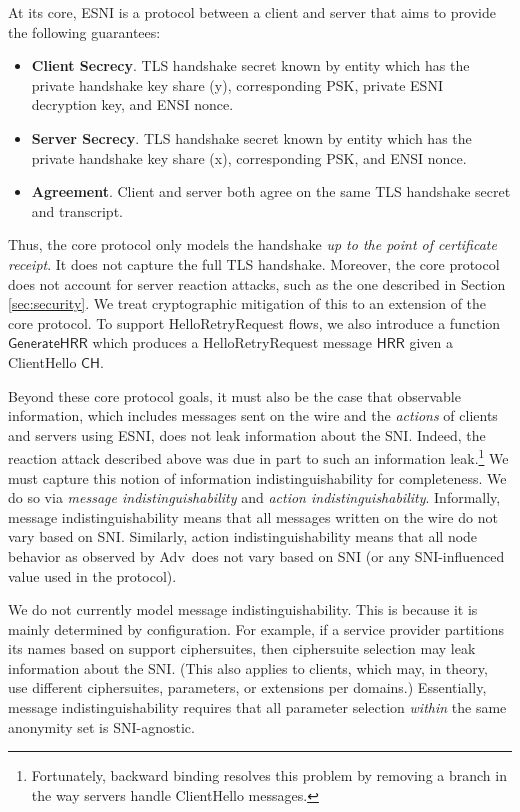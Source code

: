 \documentclass{article}
\theoremstyle{definition}
\newcommand{\adv}{{\sf Adv}}
\theoremstyle{definition}
\begin{document}
At its core, ESNI is a protocol between a client and server that aims to provide the following guarantees:
%
\begin{itemize}
  \item {\bf Client Secrecy}. TLS handshake secret known by entity which has the private handshake key 
  share (y), corresponding PSK, private ESNI decryption key, and ENSI nonce. 
  \item {\bf Server Secrecy}. TLS handshake secret known by entity which has the private handshake key 
  share (x), corresponding PSK, and ENSI nonce.
  \item {\bf Agreement}. Client and server both agree on the same TLS handshake secret and transcript.
\end{itemize}
%

Thus, the core protocol only models the handshake \emph{up to the point of certificate receipt}. It does
not capture the full TLS handshake. Moreover, the core protocol does not account for server reaction
attacks, such as the one described in Section \ref{sec:security}. We treat cryptographic mitigation
of this to an extension of the core protocol. To support HelloRetryRequest flows, we also introduce a 
function $\mathsf{GenerateHRR}$ which produces a HelloRetryRequest message $\mathsf{HRR}$ given a 
ClientHello $\mathsf{CH}$.

Beyond these core protocol goals, it must also be the case that observable information, which includes 
messages sent on the wire and the \emph{actions} of clients and servers using ESNI, does not leak information
about the SNI. Indeed, the reaction attack described above was due in part to such an information 
leak.\footnote{Fortunately, backward binding resolves this problem by removing a branch in the way servers
handle ClientHello messages.} We must capture this notion of information indistinguishability for completeness.
We do so via \emph{message indistinguishability} and \emph{action indistinguishability}. Informally, message 
indistinguishability means that all messages written on the wire do not vary based on SNI. Similarly, action
indistinguishability means that all node behavior as observed by \adv\ does not vary based on SNI (or any SNI-influenced
value used in the protocol). 

We do not currently model message indistinguishability. This is because it is mainly determined by configuration.
For example, if a service provider partitions its names based on support ciphersuites, then ciphersuite
selection may leak information about the SNI. (This also applies to clients, which may, in theory, use different
ciphersuites, parameters, or extensions per domains.) Essentially, message indistinguishability requires that
all parameter selection \emph{within} the same anonymity set is SNI-agnostic.
\end{document}
